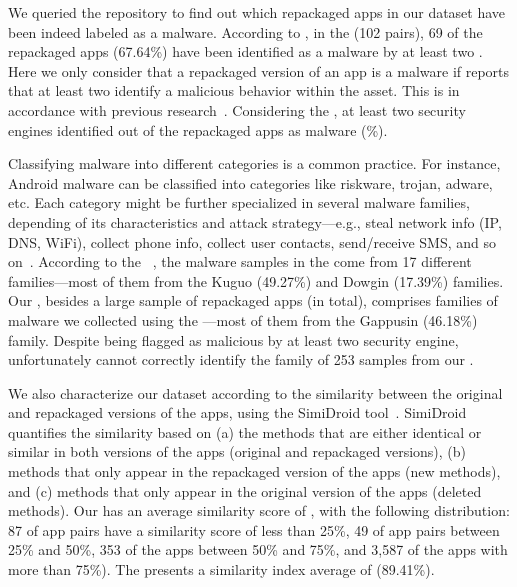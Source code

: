We queried the \vt repository to find out which repackaged apps in our
dataset have been indeed labeled as a malware.
According to \vt, in the \sds (102 pairs),
69 of the repackaged apps (67.64\%) have been identified as a malware by at least two
\ses. Here we only consider that a repackaged version of an app is a malware if \vt reports that at least
two \ses identify a malicious behavior within the asset. This is in accordance with previous research~\cite{vt-label,DBLP:journals/ese/KhanmohammadiEH19}. Considering the \cds, at least two security engines identified \malwares out of the \apps repackaged apps as malware (\malwaresP\%).

Classifying malware into different categories is a common practice. For instance, Android malware can be classified into categories
like riskware, trojan, adware, etc. Each category might be further specialized in several malware families, depending of its
characteristics and attack strategy---e.g., steal network info (IP, DNS, WiFi), collect phone info,
collect user contacts, send/receive SMS, and so on~\cite{DBLP:conf/iccns/RahaliLKTGM20}.
According to the
\avt~\cite{avclass2-paper}, the malware samples in the \sds come from 17 different families---most of them from the Kuguo (49.27\%) and Dowgin (17.39\%) families.  
Our \cds, besides a large sample of repackaged apps (\apps in total),
comprises  families of malware we collected using the \avt---most
of them from the Gappusin (46.18\%) family. Despite being flagged as malicious by at least two security engine, unfortunately \vt cannot correctly identify the family of 253 samples from our \cds.

We also characterize our dataset according to the similarity
between the original and repackaged versions of the apps, using the  
SimiDroid tool~\cite{DBLP:conf/trustcom/0029BK17}. SimiDroid quantifies the similarity
based on (a) the methods that are either identical or similar in both versions of the apps (original and repackaged versions),
(b) methods that only appear in the repackaged version of the apps (new methods), and (c) methods that only appear in the
original version of the apps (deleted methods).
Our \cds has an average similarity score of , with the following distribution: 87 of
app pairs have a similarity score of less than 25\%, 49 of app pairs
between 25\% and 50\%,  353 of the apps between 50\% and 75\%,
and 3,587 of the apps with more than 75\%). The \sds presents a similarity index average of (89.41\%).


